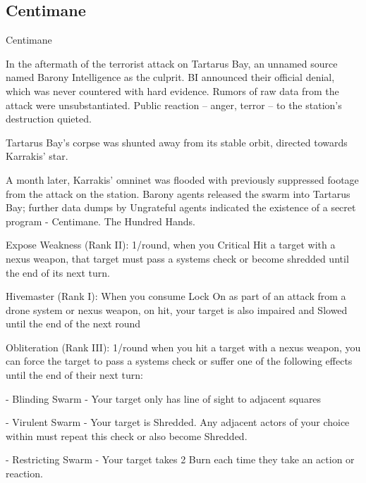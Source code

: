 \subsection{Centimane}

                                                   Centimane

In the aftermath of the terrorist attack on Tartarus Bay, an unnamed source named Barony Intelligence as
the culprit. BI announced their official denial, which was never countered with hard evidence. Rumors of raw
data from the attack were unsubstantiated. Public reaction -- anger, terror -- to the station’s destruction
quieted.

 Tartarus Bay’s corpse was shunted away from its stable orbit, directed towards Karrakis’ star.

A month later, Karrakis’ omninet was flooded with previously suppressed footage from the attack on the
station. Barony agents released the swarm into Tartarus Bay; further data dumps by Ungrateful agents
indicated the existence of a secret program - Centimane. The Hundred Hands.




Expose Weakness (Rank II): 1/round, when you Critical Hit a target with a nexus weapon, that
target must pass a systems check or become shredded until the end of its next turn.

Hivemaster (Rank I): When you consume Lock On as part of an attack from a drone system or
nexus weapon, on hit, your target is also impaired and Slowed until the end of the next round

Obliteration (Rank III): 1/round when you hit a target with a nexus weapon, you can force the
target to pass a systems check or suffer one of the following effects until the end of their next
turn:

	        - Blinding Swarm - Your target only has line of sight to adjacent squares

	        - Virulent Swarm - Your target is Shredded. Any adjacent actors of your choice within
must repeat this check or also become Shredded.

	        - Restricting Swarm - Your target takes 2 Burn each time they take an action or reaction.
